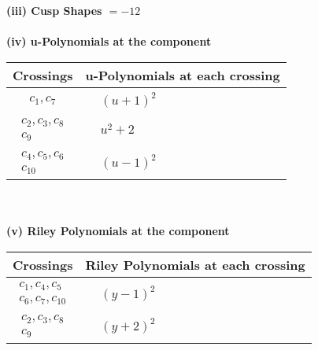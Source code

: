 \documentclass[1p]{elsarticle_modified}
\theoremstyle{definition}
\begin{document}
\flushleft \textbf{(iii) Cusp Shapes $= -12$}\\~\\
\newpage\renewcommand{\arraystretch}{1}
\flushleft \textbf{(iv) u-Polynomials at the component}\newline \\
\begin{tabular}{m{50pt}|m{274pt}}
Crossings & \hspace{64pt}u-Polynomials at each crossing \\
\hline $$\begin{aligned}c_{1},c_{7}\end{aligned}$$&$\begin{aligned}
&(u+1)^2
\end{aligned}$\\
\hline $$\begin{aligned}c_{2},c_{3},c_{8}\\c_{9}\end{aligned}$$&$\begin{aligned}
&u^2+2
\end{aligned}$\\
\hline $$\begin{aligned}c_{4},c_{5},c_{6}\\c_{10}\end{aligned}$$&$\begin{aligned}
&(u-1)^2
\end{aligned}$\\
\hline
\end{tabular}\\~\\
\newpage\renewcommand{\arraystretch}{1}
\flushleft \textbf{(v) Riley Polynomials at the component}\newline \\
\begin{tabular}{m{50pt}|m{274pt}}
Crossings & \hspace{64pt}Riley Polynomials at each crossing \\
\hline $$\begin{aligned}c_{1},c_{4},c_{5}\\c_{6},c_{7},c_{10}\end{aligned}$$&$\begin{aligned}
&(y-1)^2
\end{aligned}$\\
\hline $$\begin{aligned}c_{2},c_{3},c_{8}\\c_{9}\end{aligned}$$&$\begin{aligned}
&(y+2)^2
\end{aligned}$\\
\hline
\end{tabular}\\~\\
\end{document}
